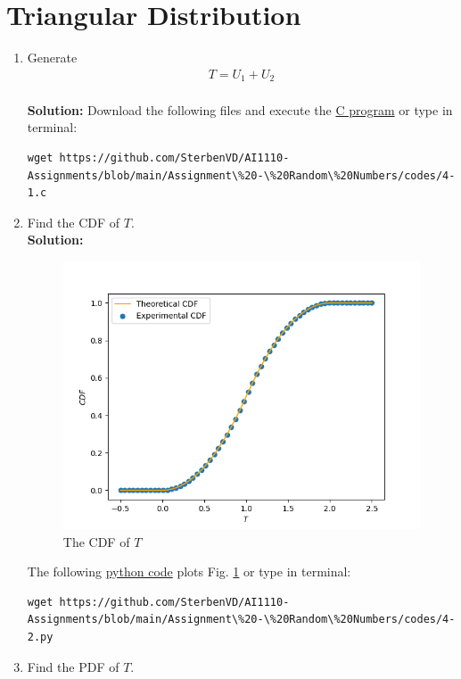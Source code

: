 \documentclass[journal,12pt,twocolumn]{IEEEtran}
\numberwithin{equation}{section}
\renewcommand\thesection{\arabic{section}}
\providecommand{\gitlink}[2]{{\color{blue}\href{https://github.com/SterbenVD/AI1110-Assignments/blob/main/Assignment\%20-\%20Random\%20Numbers/#1}{#2}}}
\newcommand{\solution}{\noindent \textbf{\\ Solution: }}
\begin{document}
\section{Triangular Distribution}
\begin{enumerate}[label=\thesection.\arabic*
        ,ref=\thesection.\theenumi]
    \item Generate
          \begin{align}
              T = U_1+U_2
          \end{align}
          \solution Download the following files and execute the \gitlink{codes/4-1.c}{C program} or type in terminal:
          \begin{lstlisting}
wget https://github.com/SterbenVD/AI1110-Assignments/blob/main/Assignment\%20-\%20Random\%20Numbers/codes/4-1.c
            \end{lstlisting}
    \item Find the CDF of $T$.
          \solution
          \begin{figure}[H]
              \centering
              \includegraphics[width = \columnwidth]{../figs/4_cdf}
              \caption{The CDF of $T$}
              \label{fig:4_cdf}
          \end{figure}
          The following \gitlink{codes/4-2.py}{python code} plots Fig. \ref{fig:4_cdf} or type in terminal:
          \begin{lstlisting}
wget https://github.com/SterbenVD/AI1110-Assignments/blob/main/Assignment\%20-\%20Random\%20Numbers/codes/4-2.py
            \end{lstlisting}
    \item Find the PDF of $T$.

\end{enumerate}
\end{document}
